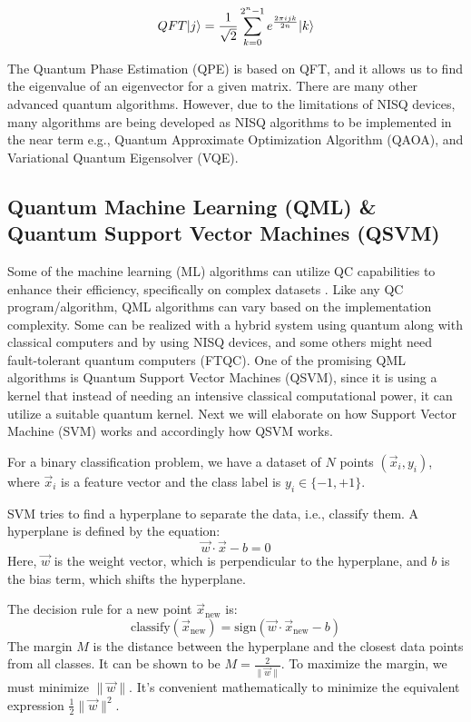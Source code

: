 \documentclass[12pt,a4paper]{article}
\DeclarePairedDelimiter\ket{\lvert}{\rangle}
\begin{document}
	\begin{equation}
		\label{eqn:equation2}
		QFT\ket{j} = \frac{1}{\sqrt{2}} \sum_{k=0}^{2^n-1} e^\frac{2\pi ijk}{2n} \ket{k}
	\end{equation}
	
	The Quantum Phase Estimation (QPE) is based on QFT, and it allows us to find the eigenvalue of an eigenvector for a given matrix. There are many other advanced quantum algorithms. However, due to the limitations of NISQ devices, many algorithms are being developed as NISQ algorithms to be implemented in the near term e.g., Quantum Approximate Optimization Algorithm (QAOA), and Variational Quantum Eigensolver (VQE). 
	
	\subsection{Quantum Machine Learning (QML) \& Quantum Support Vector Machines (QSVM) }
	
	Some of the machine learning (ML) algorithms can utilize QC capabilities to enhance their efficiency, specifically on complex datasets \cite{electronics12112379} \cite{maouaki2024quantumsupportvectormachine}. Like any QC program/algorithm, QML algorithms can vary based on the implementation complexity. Some can be realized with a hybrid system using quantum along with classical computers and by using NISQ devices, and some others might need fault-tolerant quantum computers (FTQC). One of the promising QML algorithms is Quantum Support Vector Machines (QSVM), since it is using a kernel that instead of needing an intensive classical computational power, it can utilize a suitable quantum kernel. Next we will elaborate on how Support Vector Machine (SVM) works and accordingly how QSVM works.
	
	For a binary classification problem, we have a dataset of $N$ points $(\vec{x}_i, y_i)$, where $\vec{x}_i$ is a feature vector and the class label is $y_i \in \{-1, +1\}$.
	
	SVM tries to find a hyperplane to separate the data, i.e., classify them. A hyperplane is defined by the equation:
	\[
	\vec{w} \cdot \vec{x} - b = 0
	\]
	Here, $\vec{w}$ is the weight vector, which is perpendicular to the hyperplane, and $b$ is the bias term, which shifts the hyperplane.
	
	The decision rule for a new point $\vec{x}_{\text{new}}$ is:
	\[
	\text{classify}(\vec{x}_{\text{new}}) = \text{sign}(\vec{w} \cdot \vec{x}_{\text{new}} - b)
	\]
	The margin $M$ is the distance between the hyperplane and the closest data points from all classes. It can be shown to be $M = \frac{2}{\|\vec{w}\|}$. To maximize the margin, we must minimize $\|\vec{w}\|$. It's convenient mathematically to minimize the equivalent expression $\frac{1}{2}\|\vec{w}\|^2$.
	
\end{document}
